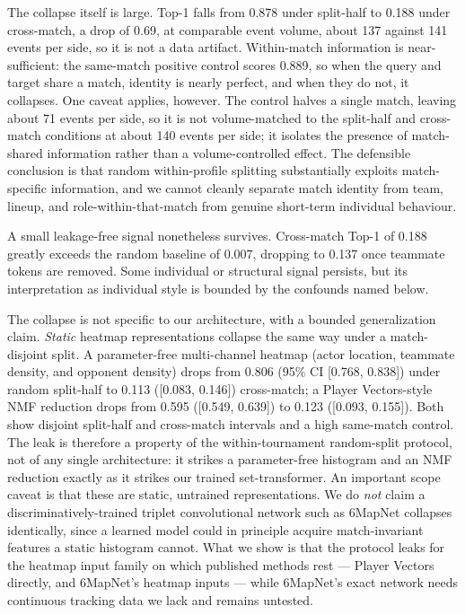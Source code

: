 The collapse itself is large. Top-1 falls from 0.878 under split-half to 0.188
under cross-match, a drop of 0.69, at comparable event volume, about 137
against 141 events per side, so it is not a data artifact. Within-match
information is near-sufficient: the same-match positive control scores 0.889,
so when the query and target share a match, identity is nearly perfect, and
when they do not, it collapses. One caveat applies, however. The control halves
a single match, leaving about 71 events per side, so it is not volume-matched
to the split-half and cross-match conditions at about 140 events per side; it
isolates the presence of match-shared information rather than a
volume-controlled effect. The defensible conclusion is that random
within-profile splitting substantially exploits match-specific information, and
we cannot cleanly separate match identity from team, lineup, and
role-within-that-match from genuine short-term individual behaviour.

A small leakage-free signal nonetheless survives. Cross-match Top-1 of 0.188
greatly exceeds the random baseline of 0.007, dropping to 0.137 once teammate
tokens are removed. Some individual or structural signal persists, but its
interpretation as individual style is bounded by the confounds named below.

The collapse is not specific to our architecture, with a bounded generalization
claim. \emph{Static} heatmap representations collapse the same way under a
match-disjoint split. A parameter-free multi-channel heatmap (actor location,
teammate density, and opponent density) drops from 0.806 (95\% CI [0.768,
0.838]) under random split-half to 0.113 ([0.083, 0.146]) cross-match; a Player
Vectors-style NMF reduction drops from 0.595 ([0.549, 0.639]) to 0.123 ([0.093,
0.155]). Both show disjoint split-half and cross-match intervals and a high
same-match control. The leak is therefore a property of the within-tournament
random-split protocol, not of any single architecture: it strikes a
parameter-free histogram and an NMF reduction exactly as it strikes our trained
set-transformer. An important scope caveat is that these are static, untrained
representations. We do \emph{not} claim a discriminatively-trained triplet
convolutional network such as 6MapNet collapses identically, since a learned
model could in principle acquire match-invariant features a static histogram
cannot. What we show is that the protocol leaks for the heatmap input family on
which published methods rest --- Player Vectors directly, and 6MapNet's heatmap
inputs --- while 6MapNet's exact network needs continuous tracking data we lack
and remains untested.

